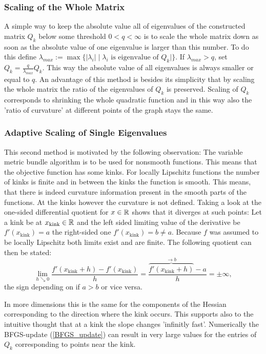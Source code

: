 \subsubsection{Scaling of the Whole Matrix}

A simple way to keep the absolute value all of eigenvalues of the constructed matrix \(Q_k\) below some threshold \(0 < q < \infty\) is to scale the whole matrix down as soon as the absolute value of one eigenvalue is larger than this number.
To do this define \(\lambda_{max} := \max\{|\lambda_i|\mid \lambda_i \text{ is eigenvalue of } Q_k|\}\). If  \(\lambda_{max} > q\), set \(Q_k = \frac{q}{\lambda_{max}}Q_k\). This way the absolute value of all eigenvalues is always smaller or equal to \(q\).
An advantage of this method is besides its simplicity that by scaling the whole matrix the ratio of the eigenvalues of \(Q_k\) is preserved. Scaling of \(Q_k\) corresponds to shrinking the whole quadratic function and in this way also the 'ratio of curvature' at different points of the graph stays the same. 

\subsubsection{Adaptive Scaling of Single Eigenvalues}

This second method is motivated by the following observation: The variable metric bundle algorithm is to be used for nonsmooth functions. This means that the objective function has some kinks. 
For locally Lipschitz functions the number of kinks is finite and in between the kinks the function is smooth.
This means, that there is indeed curvature information present in the smooth parts of the functions. At the kinks however the curvature is not defined. Taking a look at the one-sided differential quotient for \(x \in \mathbb{R}\) shows that it diverges at such points:
Let a kink be at \(x_{\text{kink}} \in \mathbb{R}\) and the left sided limiting value of the derivative be \(f'(x_{\text{kink}}) = a\) the right-sided one \(f'(x_{\text{kink}}) = b \neq a\). Because \(f\) was assumed to be locally Lipschitz both limits exist and are finite.
The following quotient can then be stated:
\[ \lim_{h \searrow 0} \frac{f'(x_{\text{kink}}+h)-f'(x_{\text{kink}})}{h} = \frac{\overbrace{f'(x_{\text{kink}}+h)}^{\to b}-a}{h} = \pm \infty, \]
the sign depending on if \(a > b\) or vice versa. 

In more dimensions this is the same for the components of the Hessian corresponding to the direction where the kink occurs. This supports also to the intuitive thought that at a kink the slope changes 'infinitly fast'.
Numerically the BFGS-update (\ref{BFGS_update}) can result in very large values for the entries of \(Q_k\) corresponding to points near the kink.


